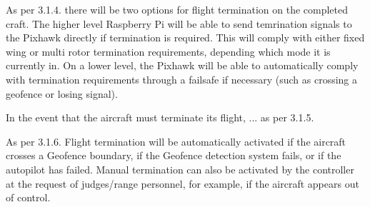 As per 3.1.4. there will be two options for flight termination on the completed craft. The higher level Raspberry Pi will be able to send temrination signals to the Pixhawk directly if termination is required. This will comply with either fixed wing or multi rotor termination requirements, depending which mode it is currently in. On a lower level, the Pixhawk will be able to automatically comply with termination requirements through a failsafe if necessary (such as crossing a geofence or losing signal).

In the event that the aircraft must terminate its flight, ... as per 3.1.5.

As per 3.1.6. Flight termination will be automatically activated if the aircraft crosses a Geofence boundary, if the Geofence detection system fails, or if the autopilot has failed. Manual termination can also be activated by the controller at the request of judges/range personnel, for example, if the aircraft appears out of control.